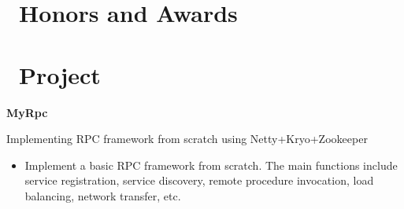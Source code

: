 \documentclass{resume}
\begin{document}
\section{\faHeartO\ Honors and Awards}

\section{\faInfo\ Project}
\textbf{MyRpc}


   Implementing RPC framework from scratch using Netty+Kryo+Zookeeper
\begin{itemize}[parsep=0.5ex]
  \item Implement a basic RPC framework from scratch. The main functions include service registration, service discovery, remote procedure invocation, load balancing, network transfer, etc.
\end{itemize}

%
%
\end{document}

